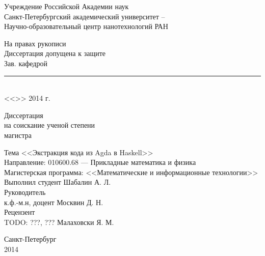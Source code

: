 \begin{titlepage}

\begin{center}
Учреждение Российской Академии наук\\
Санкт-Петербургский академический университет --\\
Научно-образовательный центр нанотехнологий РАН
\end{center}

\vspace{1cm}

\begin{flushright}
\begin{minipage}{0.5\textwidth}
\begin{center}
На правах рукописи\\[.5cm]
Диссертация допущена к защите\\
Зав. кафедрой\\[.3cm]
\rule{7cm}{.5pt}\\
<<\hspace{.8cm}>> \underline{\hspace{3.5cm}} 2014 г.\\
\end{center}
\end{minipage}
\end{flushright}

\vspace{1cm}

\begin{center}
Диссертация\\
на соискание ученой степени\\
магистра
\end{center}

\begin{flushleft}
Тема <<Экстракция кода из Agda в Haskell>>\\[.5cm]

Направление: 010600.68 --- Прикладные математика и физика\\[.5cm]

Магистерская программа: <<Математические и информационные технологии>>\\[1cm]

Выполнил студент \hfill Шабалин А. Л.\\[.5cm]

Руководитель\\
к.ф.-м.н, доцент \hfill Москвин Д. Н.\\[.5cm]

Рецензент\\
TODO: ???, ??? \hfill Малаховски Я. М.
\end{flushleft}

\vfill

\begin{center}
Санкт-Петербург\\
2014
\end{center}

\end{titlepage}

